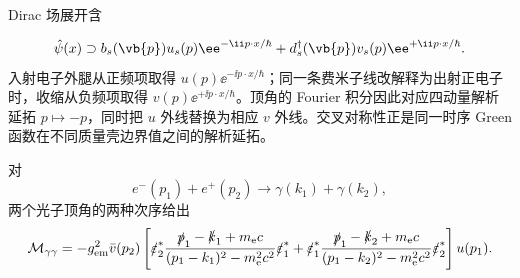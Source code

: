 \begin{derivation}
Dirac 场展开含

\begin{equation*}
 \hat\psi(x)\supset b_s(\vb{p})u_s(p)\ee^{-\ii p\cdot x/\hbar}
 +d_s^\dagger(\vb{p})v_s(p)\ee^{+\ii p\cdot x/\hbar}.
\end{equation*}
入射电子外腿从正频项取得 $u(p)\ee^{-\ii p\cdot x/\hbar}$；同一条费米子线改解释为出射正电子时，收缩从负频项取得 $v(p)\ee^{+\ii p\cdot x/\hbar}$。顶角的 Fourier 积分因此对应四动量解析延拓 $p\mapsto-p$，同时把 $u$ 外线替换为相应 $v$ 外线。交叉对称性正是同一时序 Green 函数在不同质量壳边界值之间的解析延拓。

对
\begin{equation*}
 e^-(p_1)+e^+(p_2)\to\gamma(k_1)+\gamma(k_2),
\end{equation*}
两个光子顶角的两种次序给出
\begin{equation*}
 {
 \mathcal M_{\gamma\gamma}
 =-g_{\rm em}^2\bar v(p_2)\left[
 \slashed\varepsilon_2^*
 \frac{\slashed p_1-\slashed k_1+m_{\mathrm e} c}{(p_1-k_1)^2-m_{\mathrm e}^2c^2}
 \slashed\varepsilon_1^*
 +\slashed\varepsilon_1^*
 \frac{\slashed p_1-\slashed k_2+m_{\mathrm e} c}{(p_1-k_2)^2-m_{\mathrm e}^2c^2}
 \slashed\varepsilon_2^*
 \right]u(p_1).}
 \end{equation*}
\end{derivation}

